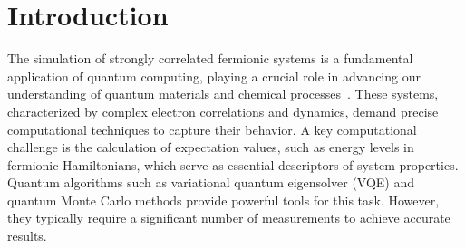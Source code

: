 \documentclass[showpacs,twocolumn,aps,prx,long bibliography,superscriptaddress,notitlepage]{revtex4-1}
\begin{document}
\section{Introduction}

The simulation of strongly correlated fermionic systems is a fundamental application of quantum computing, playing a crucial role in advancing our understanding of quantum materials and chemical processes~\cite{lieb1961two, si1996kosterlitz,aspuru2005simulated,whitfield2011simulation,auerbach2012interacting,cao2019quantum}.
These systems, characterized by complex electron correlations and dynamics, demand precise computational techniques to capture their behavior. 
A key computational challenge is the calculation of expectation values, such as energy levels in fermionic Hamiltonians, which serve as essential descriptors of system properties. 
Quantum algorithms such as variational quantum eigensolver (VQE)\cite{tilly2022variational, cerezo2021variational} and quantum Monte Carlo methods\cite{foulkes2001quantum, carlson2015quantum} provide powerful tools for this task. However, they typically require a significant number of measurements to achieve accurate results.
\end{document}
